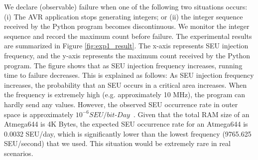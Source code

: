 We declare (observable) failure when one of the following two situations occurs: (i) The AVR application stops generating integers; or (ii) the integer sequence received by the Python program becomes discontinuous. We monitor the integer sequence and record the maximum count before failure. The experimental results are summarized in Figure \ref{fig:exp1_result}. The x-axis represents SEU injection frequency, and the y-axis represents the maximum count received by the Python program. The figure shows that as SEU injection frequency increases, running time to failure decreases. This is explained as follows: As SEU injection frequency increases, the probability that an SEU occurs in a critical area increases. When the frequency is extremely high (e.g. approximately 10 MHz), the program can hardly send any values. However, the observed SEU occurrence rate in outer space is approximately $10^{-6}SEU/bit$-$Day$~\cite{underwood1992observations}. Given that the total RAM size of an Atmega644 is 4K Bytes, the expected SEU occurrence rate for an Atmega644 is 0.0032 SEU/day, which is significantly lower than the lowest frequency (9765.625 SEU/second) that we used. This situation would be extremely rare in real scenarios.
